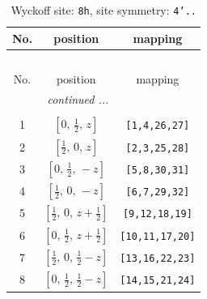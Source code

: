 \documentclass[fleqn,8pt]{jsarticle}
\begin{document}
\begin{longtable}{ccc}
\caption{Wyckoff site: {\tt 8h}, site symmetry: {\tt 4'..}}
 \\
 \hline \hline
No. & position & mapping \\ \hline \endfirsthead

\multicolumn{2}{l}{\tablename\ \thetable{}} \\
 \hline \hline
No. & position & mapping \\ \hline \endhead

 \hline \hline
\multicolumn{2}{r}{\footnotesize\it continued ...} \\ \endfoot

 \hline \hline
\multicolumn{2}{r}{} \\ \endlastfoot

1 & $\left[ 0,\, \frac{1}{2},\, z \right]$ & {\tt [1,4,26,27]} \\ \hline
2 & $\left[ \frac{1}{2},\, 0,\, z \right]$ & {\tt [2,3,25,28]} \\ \hline
3 & $\left[ 0,\, \frac{1}{2},\, - z \right]$ & {\tt [5,8,30,31]} \\ \hline
4 & $\left[ \frac{1}{2},\, 0,\, - z \right]$ & {\tt [6,7,29,32]} \\ \hline
5 & $\left[ \frac{1}{2},\, 0,\, z + \frac{1}{2} \right]$ & {\tt [9,12,18,19]} \\ \hline
6 & $\left[ 0,\, \frac{1}{2},\, z + \frac{1}{2} \right]$ & {\tt [10,11,17,20]} \\ \hline
7 & $\left[ \frac{1}{2},\, 0,\, \frac{1}{2} - z \right]$ & {\tt [13,16,22,23]} \\ \hline
8 & $\left[ 0,\, \frac{1}{2},\, \frac{1}{2} - z \right]$ & {\tt [14,15,21,24]} \\
\end{longtable}
\renewcommand{\arraystretch}{1.2}
\end{document}
